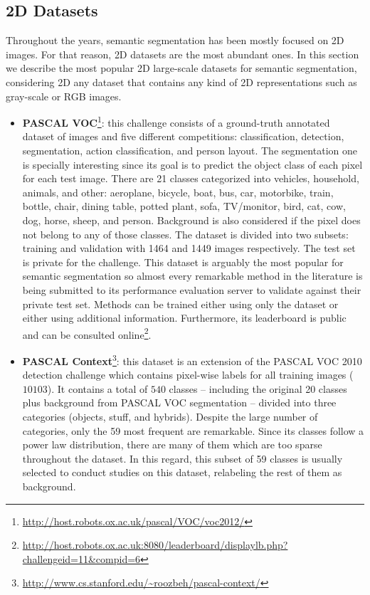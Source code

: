 \subsection{2D Datasets}

Throughout the years, semantic segmentation has been mostly focused on \acl{2D} images. For that reason, \acs{2D} datasets are the most abundant ones. In this section we describe the most popular \acs{2D} large-scale datasets for semantic segmentation, considering \acs{2D} any dataset that contains any kind of \acl{2D} representations such as gray-scale or \ac{RGB} images.

\begin{itemize}
	\item \textbf{PASCAL \acf{VOC}}\cite{Everingham2015}\footnote{\url{http://host.robots.ox.ac.uk/pascal/VOC/voc2012/}}: this challenge consists of a ground-truth annotated dataset of images and five different competitions: classification, detection, segmentation, action classification, and person layout. The segmentation one is specially interesting since its goal is to predict the object class of each pixel for each test image. There are 21 classes categorized into vehicles, household, animals, and other: aeroplane, bicycle, boat, bus, car, motorbike, train, bottle, chair, dining table, potted plant, sofa, TV/monitor, bird, cat, cow, dog, horse, sheep, and person. Background is also considered if the pixel does not belong to any of those classes. The dataset is divided into two subsets: training and validation with 1464 and 1449 images respectively. The test set is private for the challenge. This dataset is arguably the most popular for semantic segmentation so almost every remarkable method in the literature is being submitted to its performance evaluation server to validate against their private test set. Methods can be trained either using only the dataset or either using additional information. Furthermore, its leaderboard is public and can be consulted online\footnote{\url{http://host.robots.ox.ac.uk:8080/leaderboard/displaylb.php?challengeid=11&compid=6}}.
	\item \textbf{PASCAL Context}\cite{Mottaghi2014}\footnote{\url{http://www.cs.stanford.edu/~roozbeh/pascal-context/}}: this dataset is an extension of the PASCAL \ac{VOC} 2010 detection challenge which contains pixel-wise labels for all training images ($10103$). It contains a total of $540$ classes -- including the original 20 classes plus background from PASCAL \ac{VOC} segmentation -- divided into three categories (objects, stuff, and hybrids). Despite the large number of categories, only the 59 most frequent are remarkable. Since its classes follow a power law distribution, there are many of them which are too sparse throughout the dataset. In this regard, this subset of 59 classes is usually selected to conduct studies on this dataset, relabeling the rest of them as background.

\end{itemize}
